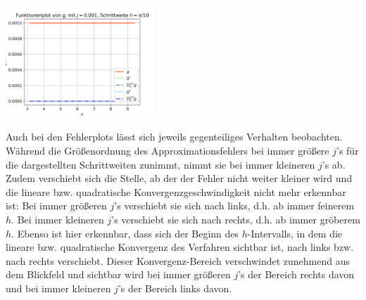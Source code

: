 \documentclass{scrartcl}
\begin{document}
{    \includegraphics[width=0.42\textwidth]{Grafiken/Funktionenplot_j0001_Pi_Zehntel}\\
    \vspace{-0.2cm}

    \vspace{0.5cm}
  }

Auch bei den Fehlerplots lässt sich jeweils gegenteiliges Verhalten beobachten. Während die Größenordnung des Approximationsfehlers bei immer größere $j$'s für die dargestellten Schrittweiten zunimmt, nimmt sie bei immer kleineren $j$'s ab. Zudem verschiebt sich die Stelle, ab der der Fehler nicht weiter kleiner wird und die lineare bzw. quadratische Konvergenzgeschwindigkeit nicht mehr erkennbar ist: Bei immer größeren $j$'s verschiebt sie sich nach links, d.h. ab immer feinerem $h$. Bei immer kleineren $j$'s verschiebt sie sich nach rechts, d.h. ab immer gröberem $h$. Ebenso ist hier erkennbar, dass sich der Beginn des $h$-Intervalls, in dem die lineare bzw. quadratische Konvergenz des Verfahren sichtbar ist, nach links bzw. nach rechts verschiebt. Dieser Konvergenz-Bereich verschwindet zunehmend aus dem Blickfeld und sichtbar wird bei immer größeren $j$'s der Bereich rechts davon und bei immer kleineren $j$'s der Bereich links davon.
\end{document}
